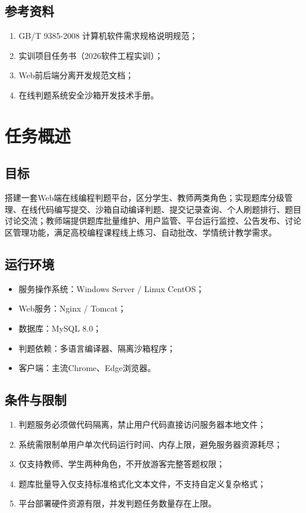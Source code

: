 \documentclass{../template/softeng}
\begin{document}
\subsection{参考资料}
\begin{enumerate}
    \item GB/T 9385-2008 计算机软件需求规格说明规范；
    \item 实训项目任务书（2026软件工程实训）；
    \item Web前后端分离开发规范文档；
    \item 在线判题系统安全沙箱开发技术手册。
\end{enumerate}

\section{任务概述}
\subsection{目标}
搭建一套Web端在线编程判题平台，区分学生、教师两类角色；实现题库分级管理、在线代码编写提交、沙箱自动编译判题、提交记录查询、个人刷题排行、题目讨论交流；教师端提供题库批量维护、用户监管、平台运行监控、公告发布、讨论区管理功能，满足高校编程课程线上练习、自动批改、学情统计教学需求。

\subsection{运行环境}
\begin{itemize}
    \item 服务操作系统：Windows Server / Linux CentOS；
    \item Web服务：Nginx / Tomcat；
    \item 数据库：MySQL 8.0；
    \item 判题依赖：多语言编译器、隔离沙箱程序；
    \item 客户端：主流Chrome、Edge浏览器。
\end{itemize}

\subsection{条件与限制}
\begin{enumerate}
    \item 判题服务必须做代码隔离，禁止用户代码直接访问服务器本地文件；
    \item 系统需限制单用户单次代码运行时间、内存上限，避免服务器资源耗尽；
    \item 仅支持教师、学生两种角色，不开放游客完整答题权限；
    \item 题库批量导入仅支持标准格式化文本文件，不支持自定义复杂格式；
    \item 平台部署硬件资源有限，并发判题任务数量存在上限。
\end{enumerate}
\end{document}
